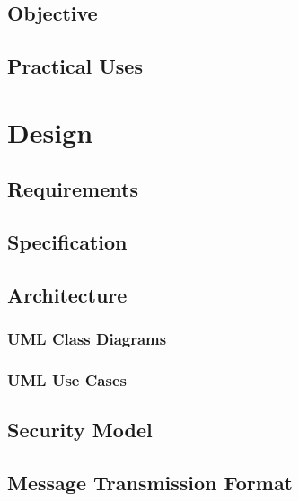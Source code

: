 \documentclass[a4paper,12pt]{report}
\begin{document}
\section{Objective}



\section{Practical Uses}




\chapter{Design}

\section{Requirements}



\section{Specification}



\section{Architecture}



\subsection{UML Class Diagrams}

\subsection{UML Use Cases}



\section{Security Model}

\section{Message Transmission Format}
\end{document}
